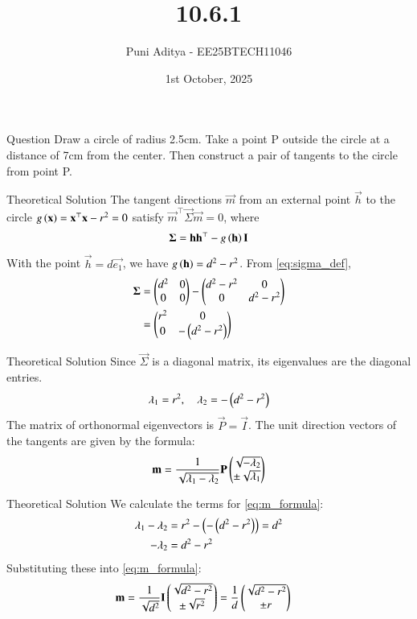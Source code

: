 \documentclass{beamer}
\title{10.6.1}
\date{1st October, 2025}
\author{Puni Aditya - EE25BTECH11046}
\begin{document}
\frame{\titlepage}
\begin{frame}{Question}
Draw a circle of radius 2.5cm. Take a point P outside the circle at a distance of 7cm from the center. Then construct a pair of tangents to the circle from point P.
\end{frame}

\begin{frame}{Theoretical Solution}
The tangent directions $\vec{m}$ from an external point $\vec{h}$ to the circle $g\left(\mathbf{x}\right)=\mathbf{x}^\top\mathbf{x}-r^2=0$ satisfy $\vec{m}^\top\vec{\Sigma}\vec{m} = 0$, where
\begin{align}
    \mathbf{\Sigma} = \mathbf{h}\mathbf{h}^\top - g\left(\mathbf{h}\right)\mathbf{I} \label{eq:sigma_def}
\end{align}
With the point $\vec{h}=d\vec{e_1}$, we have $g\left(\mathbf{h}\right) = d^2-r^2$. From \eqref{eq:sigma_def},
\begin{align}
    \mathbf{\Sigma} &= \begin{pmatrix}d^2 & 0 \\ 0 & 0\end{pmatrix} - \begin{pmatrix}d^2-r^2 & 0 \\ 0 & d^2-r^2\end{pmatrix} \nonumber \\
    &= \begin{pmatrix}r^2 & 0 \\ 0 & -\left(d^2-r^2\right)\end{pmatrix}
\end{align}
\end{frame}

\begin{frame}{Theoretical Solution}
Since $\vec{\Sigma}$ is a diagonal matrix, its eigenvalues are the diagonal entries.
\begin{align}
 \lambda_1 = r^2, \quad \lambda_2 = -\left(d^2-r^2\right)
\end{align}
The matrix of orthonormal eigenvectors is $\vec{P}=\vec{I}$. The unit direction vectors of the tangents are given by the formula:
\begin{align}
    \mathbf{m} = \frac{1}{\sqrt{\lambda_1-\lambda_2}}\mathbf{P}\begin{pmatrix}\sqrt{-\lambda_2} \\ \pm\sqrt{\lambda_1}\end{pmatrix} \label{eq:m_formula}
\end{align}
\end{frame}

\begin{frame}{Theoretical Solution}
We calculate the terms for \eqref{eq:m_formula}:
\begin{align}
    \lambda_1-\lambda_2 &= r^2 - \left(-\left(d^2-r^2\right)\right) = d^2 \\
    -\lambda_2 &= d^2-r^2
\end{align}
Substituting these into \eqref{eq:m_formula}:
\begin{align}
    \mathbf{m} &= \frac{1}{\sqrt{d^2}}\mathbf{I}\begin{pmatrix}\sqrt{d^2-r^2} \\ \pm\sqrt{r^2}\end{pmatrix} = \frac{1}{d}\begin{pmatrix}\sqrt{d^2-r^2} \\ \pm r\end{pmatrix}
\end{align}
\end{frame}
\end{document}
